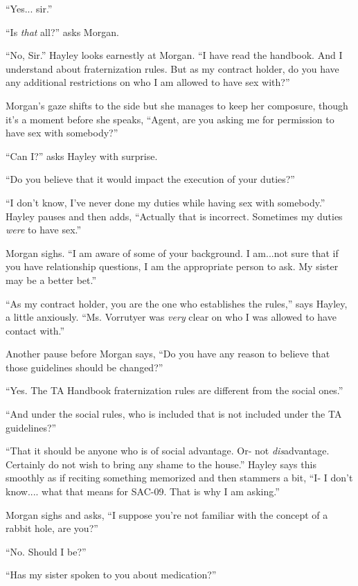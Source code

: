 ``Yes... sir.''

``Is \textit{that} all?'' asks Morgan.



``No, Sir.''  Hayley looks earnestly at Morgan.  ``I have read the handbook.  And I understand about fraternization rules.  But as my contract holder, do you have any additional restrictions on who I am allowed to have sex with?''

Morgan's gaze shifts to the side but she manages to keep her composure, though it's a moment before she speaks, ``Agent, are you asking me for permission to have sex with somebody?''

``Can I?'' asks Hayley with surprise.

``Do you believe that it would impact the execution of your duties?''

``I don't know, I've never done my duties while having sex with somebody.''  Hayley pauses and then adds, ``Actually that is incorrect.  Sometimes my duties \textit{were} to have sex.''

Morgan sighs.  ``I am aware of some of your background.  I am...not sure that if you have relationship questions, I am the appropriate person to ask.  My sister may be a better bet.''

``As my contract holder, you are the one who establishes the rules,'' says Hayley, a little anxiously.  ``Ms. Vorrutyer was \textit{very }clear on who I was allowed to have contact with.''

Another pause before Morgan says, ``Do you have any reason to believe that those guidelines should be changed?''

``Yes.  The TA Handbook fraternization rules are different from the social ones.''

``And under the social rules, who is included that is not included under the TA guidelines?''

``That it should be anyone who is of social advantage.  Or- not \textit{dis}advantage.  Certainly do not wish to bring any shame to the house.'' Hayley says this smoothly as if reciting something memorized and then stammers a bit, ``I- I don't know.... what that means for SAC-09.  That is why I am asking.''

Morgan sighs and asks, ``I suppose you're not familiar with the concept of a rabbit hole, are you?''

``No. Should I be?''

``Has my sister spoken to you about medication?''


